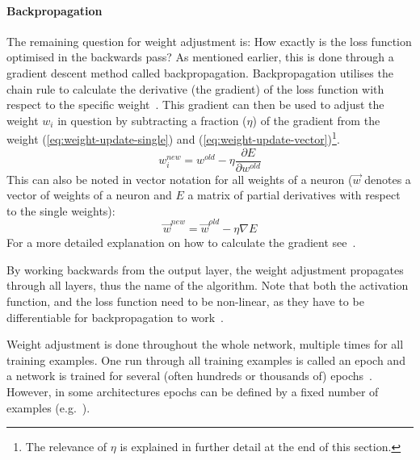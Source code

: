 \paragraph{Backpropagation}
The remaining question for weight adjustment is: How exactly is the loss function optimised in the backwards pass?
As mentioned earlier, this is done through a gradient descent method called backpropagation.
Backpropagation utilises the chain rule to calculate the derivative (the gradient) of the loss function with respect to the specific weight~\autocite[e.g.][]{Aggarwal2018}.
This gradient can then be used to adjust the weight $w_i$ in question by subtracting a fraction ($\eta$) of the gradient from the weight (\autoref{eq:weight-update-single}) and (\autoref{eq:weight-update-vector})\footnote{The relevance of $\eta$ is explained in further detail at the end of this section.}.
\begin{equation}
    w^{new}_i = w^{old} -\eta \frac{\partial E}{\partial w^{old}}
    \label{eq:weight-update-single}
\end{equation}
This can also be noted in vector notation for all weights of a neuron ($\vec{w}$ denotes a vector of weights of a neuron and $E$ a matrix of partial derivatives with respect to the single weights):
\begin{equation}
    \vec{w}^{new} = \vec{w}^{old} -\eta \nabla E
    \label{eq:weight-update-vector}
\end{equation}
For a more detailed explanation on how to calculate the gradient see~\autocite{Ruder2017}.

By working backwards from the output layer, the weight adjustment propagates through all layers, thus the name of the algorithm.
Note that both the activation function, and the loss function need to be non-linear, as they have to be differentiable for backpropagation to work~\autocite{Aggarwal2018}.

Weight adjustment is done throughout the whole network, multiple times for all training examples.
One run through all training examples is called an epoch and a network is trained for several (often hundreds or thousands of) epochs~\autocite[Chapter~4.7]{Skansi2018}.
However, in some architectures epochs can be defined by a fixed number of examples (e.g.~\autocite{Isensee2021}).

